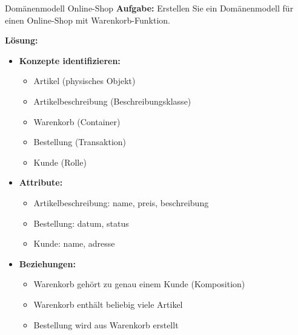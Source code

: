 \begin{example2}{Domänenmodell Online-Shop}
\textbf{Aufgabe:} Erstellen Sie ein Domänenmodell für einen Online-Shop mit Warenkorb-Funktion.

\textbf{Lösung:}
\begin{itemize}
    \item \textbf{Konzepte identifizieren:}
    \begin{itemize}
        \item Artikel (physisches Objekt)
        \item Artikelbeschreibung (Beschreibungsklasse)
        \item Warenkorb (Container)
        \item Bestellung (Transaktion)
        \item Kunde (Rolle)
    \end{itemize}
    \item \textbf{Attribute:}
    \begin{itemize}
        \item Artikelbeschreibung: name, preis, beschreibung
        \item Bestellung: datum, status
        \item Kunde: name, adresse
    \end{itemize}
    \item \textbf{Beziehungen:}
    \begin{itemize}
        \item Warenkorb gehört zu genau einem Kunde (Komposition)
        \item Warenkorb enthält beliebig viele Artikel
        \item Bestellung wird aus Warenkorb erstellt
    \end{itemize}
\end{itemize}
\end{example2}

